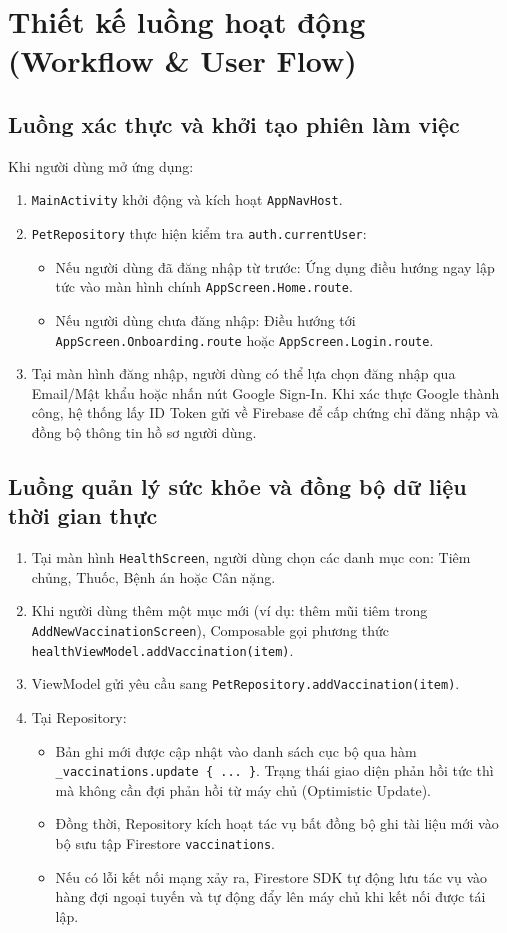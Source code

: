 \section{Thiết kế luồng hoạt động (Workflow \& User Flow)}
\label{sec:luong_hoat_dong}

\subsection{Luồng xác thực và khởi tạo phiên làm việc}
Khi người dùng mở ứng dụng:
\begin{enumerate}
    \item \texttt{MainActivity} khởi động và kích hoạt \texttt{AppNavHost}.
    \item \texttt{PetRepository} thực hiện kiểm tra \texttt{auth.currentUser}:
    \begin{itemize}
        \item Nếu người dùng đã đăng nhập từ trước: Ứng dụng điều hướng ngay lập tức vào màn hình chính \texttt{AppScreen.Home.route}.
        \item Nếu người dùng chưa đăng nhập: Điều hướng tới \texttt{AppScreen.Onboarding.route} hoặc \texttt{AppScreen.Login.route}.
    \end{itemize}
    \item Tại màn hình đăng nhập, người dùng có thể lựa chọn đăng nhập qua Email/Mật khẩu hoặc nhấn nút Google Sign-In. Khi xác thực Google thành công, hệ thống lấy ID Token gửi về Firebase để cấp chứng chỉ đăng nhập và đồng bộ thông tin hồ sơ người dùng.
\end{enumerate}

\subsection{Luồng quản lý sức khỏe và đồng bộ dữ liệu thời gian thực}
\begin{enumerate}
    \item Tại màn hình \texttt{HealthScreen}, người dùng chọn các danh mục con: Tiêm chủng, Thuốc, Bệnh án hoặc Cân nặng.
    \item Khi người dùng thêm một mục mới (ví dụ: thêm mũi tiêm trong \texttt{AddNewVaccinationScreen}), Composable gọi phương thức \texttt{healthViewModel.addVaccination(item)}.
    \item ViewModel gửi yêu cầu sang \texttt{PetRepository.addVaccination(item)}.
    \item Tại Repository:
    \begin{itemize}
        \item Bản ghi mới được cập nhật vào danh sách cục bộ qua hàm \texttt{\_vaccinations.update \{ ... \}}. Trạng thái giao diện phản hồi tức thì mà không cần đợi phản hồi từ máy chủ (Optimistic Update).
        \item Đồng thời, Repository kích hoạt tác vụ bất đồng bộ ghi tài liệu mới vào bộ sưu tập Firestore \texttt{vaccinations}.
        \item Nếu có lỗi kết nối mạng xảy ra, Firestore SDK tự động lưu tác vụ vào hàng đợi ngoại tuyến và tự động đẩy lên máy chủ khi kết nối được tái lập.
    \end{itemize}
\end{enumerate}
